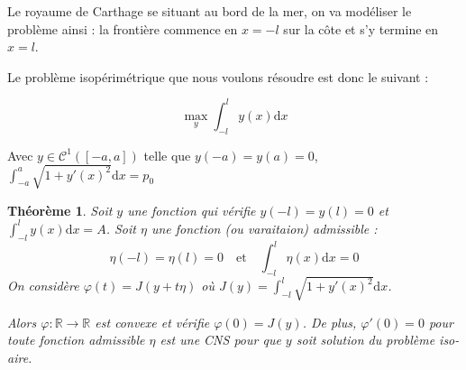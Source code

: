 \documentclass[10pt,a4paper]{article}
\newcommand{\R}{\mathbb{R}}
\newcommand{\C}{\mathcal{C}}
\renewcommand{\d}{\mathrm{d}}
\renewcommand{\phi}{\varphi}
\theoremstyle{plain}
\newtheorem{thm}{Théorème}[section]
\theoremstyle{definition}
\begin{document}
Le royaume de Carthage se situant au bord de la mer, on va modéliser le problème ainsi : la frontière commence en $x=-l$ sur la côte et s'y termine en $x=l$.

\begin{center}


\end{center}



Le problème isopérimétrique que nous voulons résoudre est donc le suivant :

\[\max_{y}\int_{-l}^l y(x)\d x\]

Avec $y\in\C^1([-a,a])$ telle que $y(-a)=y(a)=0$, $\int_{-a}^a\sqrt{1+y'(x)^2}\d x=p_0$





\begin{thm}
Soit $y$ une fonction qui vérifie $y(-l)=y(l)=0$ et $\displaystyle\int_{-l}^{l}y(x)\d x=A$. Soit $\eta$ une fonction (ou \emph{varaitaion}) \emph{admissible} :
\[\eta(-l)=\eta(l)=0\quad \text{et}\quad\int_{-l}^{l}\eta(x)\d x=0\]
On considère $\phi(t)=J(y+t\eta)$ où $J(y)=\displaystyle\int_{-l}^{l}\sqrt{1+y'(x)^2}\d x$.

Alors $\phi\colon\R\to\R$ est convexe et vérifie $\phi(0)=J(y)$. De plus, $\phi'(0)=0$ pour toute fonction admissible $\eta$ est une CNS pour que $y$ soit solution du problème iso-aire.
\end{thm}
\end{document}
